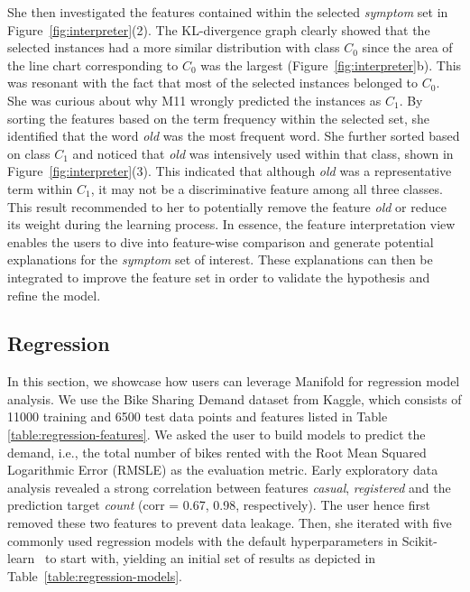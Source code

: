\documentclass[preprint,journal]{vgtc}       %
\begin{document}
She then investigated the features contained within the selected \textit{symptom} set in Figure~\ref{fig:interpreter}(2). The KL-divergence graph clearly showed that the selected instances had a more similar distribution with class $C_0$ since the area of the line chart corresponding to $C_0$ was the largest (Figure~\ref{fig:interpreter}b). This was resonant with the fact that most of the selected instances belonged to $C_0$. She was curious about why M11 wrongly predicted the instances as $C_1$. By sorting the features based on the term frequency within the selected set, she identified that the word \textit{old} was the most frequent word. She further sorted based on class $C_1$ and noticed that \textit{old} was intensively used within that class, shown in Figure~\ref{fig:interpreter}(3). This indicated that although \textit{old} was a representative term within $C_1$, it may not be a discriminative feature among all three classes. This result recommended to her to potentially remove the feature \textit{old} or reduce its weight during the learning process. In essence, the feature interpretation view enables the users to dive into feature-wise comparison and generate potential explanations for the \textit{symptom} set of interest. These explanations can then be integrated to improve the feature set in order to validate the hypothesis and refine the model.

\subsection{Regression}
In this section, we showcase how users can leverage Manifold for regression model analysis. We use the Bike Sharing Demand dataset from Kaggle, which consists of 11000 training and 6500 test data points and features listed in Table \ref{table:regression-features}. We asked the user to build models to predict the demand, i.e., the total number of bikes rented with the Root Mean Squared Logarithmic Error (RMSLE) as the evaluation metric. Early exploratory data analysis revealed a strong correlation between features \textit{casual}, \textit{registered} and the prediction target \textit{count} (corr = 0.67, 0.98, respectively). The user hence first removed these two features to prevent data leakage. Then, she iterated with five commonly used regression models with the default hyperparameters in Scikit-learn~\cite{pedregosa2011scikit} to start with, yielding an initial set of results as depicted in Table~\ref{table:regression-models}.
\end{document}
